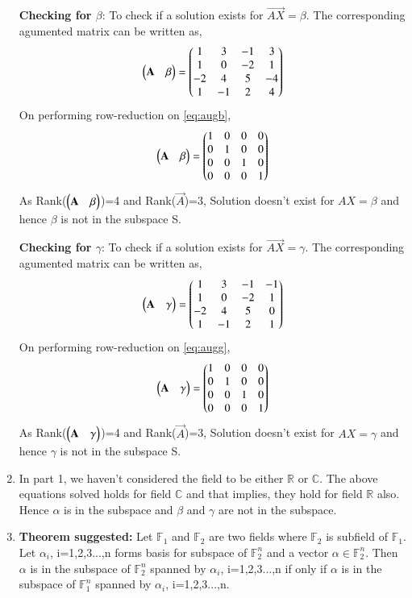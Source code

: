 \documentclass[journal,12pt,twocolumn]{IEEEtran}
\begin{document}
\begin{enumerate}
\textbf{Checking for $\beta$}:
To check if a solution exists for $\vec{AX}=\beta$. The corresponding agumented matrix can be written as,
\begin{align} \label{eq:augb}
\begin{pmatrix}\mathbf{A}&\beta\end{pmatrix}=\begin{pmatrix}1&3&-1&3\\1&0&-2&1\\-2&4&5&-4\\1&-1&2&4\end{pmatrix}
\end{align}
On performing row-reduction on \eqref{eq:augb}, 
\begin{align}\label{eq:refb}
\begin{pmatrix}\mathbf{A}&\beta\end{pmatrix}=\begin{pmatrix}1&0&0&0\\0&1&0&0\\0&0&1&0\\0&0&0&1\end{pmatrix}
\end{align}
As Rank($\begin{pmatrix}\mathbf{A}&\beta\end{pmatrix}$)=4 and Rank($\vec{A}$)=3, Solution doesn't exist for $AX=\beta$ and hence $\beta$ is not in the subspace S.

\textbf{Checking for $\gamma$}:
To check if a solution exists for $\vec{AX}=\gamma$. The corresponding agumented matrix can be written as,
\begin{align} \label{eq:augg}
\begin{pmatrix}\mathbf{A}&\gamma\end{pmatrix}=\begin{pmatrix}1&3&-1&-1\\1&0&-2&1\\-2&4&5&0\\1&-1&2&1\end{pmatrix}
\end{align}
On performing row-reduction on \eqref{eq:augg}, 
\begin{align}\label{eq:refg}
\begin{pmatrix}\mathbf{A}&\gamma\end{pmatrix}=\begin{pmatrix}1&0&0&0\\0&1&0&0\\0&0&1&0\\0&0&0&1\end{pmatrix}
\end{align}
As Rank($\begin{pmatrix}\mathbf{A}&\gamma\end{pmatrix}$)=4 and Rank($\vec{A}$)=3, Solution doesn't exist for $AX=\gamma$ and hence $\gamma$ is not in the subspace S.
\item In part 1, we haven't considered the field to be either $\mathbb{R}$ or $\mathbb{C}$. The above equations solved holds for field $\mathbb{C}$ and that implies, they hold for field $\mathbb{R}$ also. Hence $\alpha$ is in the subspace and $\beta$ and $\gamma$ are not in the subspace.
\item \textbf{Theorem suggested:}
Let $\mathbb{F}_1$ and $\mathbb{F}_2$ are two fields where $\mathbb{F}_2$ is subfield of $\mathbb{F}_1$. Let $\alpha_i$, i=1,2,3...,n forms basis for subspace of $\mathbb{F}_2^n$ and a vector $\alpha \in \mathbb{F}_2^n$. Then $\alpha$ is in the subspace of $\mathbb{F}_2^n$ spanned by $\alpha_i$, i=1,2,3...,n if only if $\alpha$ is in the subspace of $\mathbb{F}_1^n$ spanned by $\alpha_i$, i=1,2,3...,n.
\end{enumerate}
\end{document}

